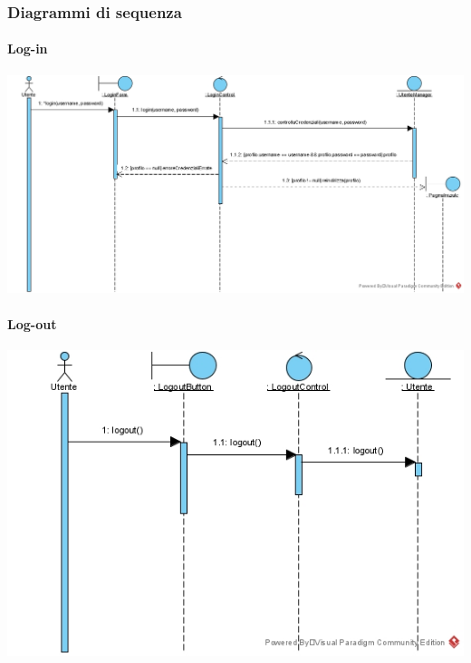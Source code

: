 \subsubsection{Diagrammi di sequenza}
\paragraph{Log-in}
\begin{center}
\includegraphics[width=\textwidth,height=\textheight,keepaspectratio]{Figure/SequenceDiagrams/Login.jpg}
\end{center}

\paragraph{Log-out}
\begin{center}
\includegraphics[width=\textwidth,height=\textheight,keepaspectratio]{Figure/SequenceDiagrams/Logout.jpg}
\end{center}

\newpage
